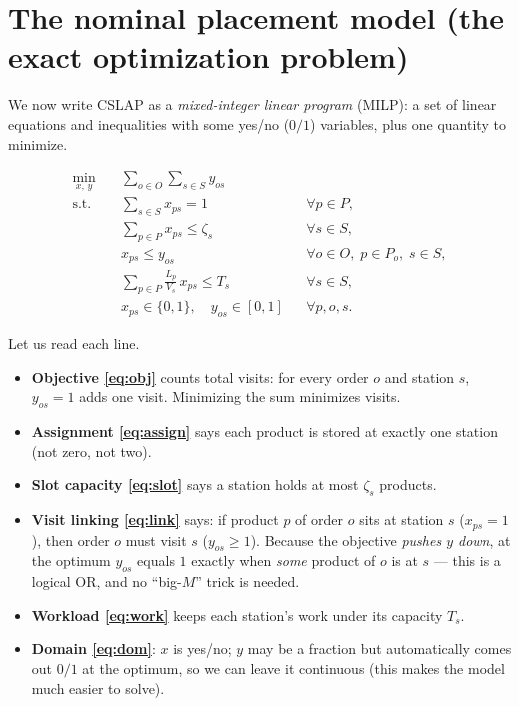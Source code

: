 \documentclass[11pt]{article}
\theoremstyle{definition}
\theoremstyle{plain}
\theoremstyle{remark}
\begin{document}
\section{The nominal placement model (the exact optimization problem)}

We now write CSLAP as a \emph{mixed-integer linear program} (MILP): a set of
linear equations and inequalities with some yes/no ($0/1$) variables, plus one
quantity to minimize.

\begin{align}
\min_{x,\,y}\quad & \sum_{o \in O}\sum_{s \in S} y_{os} \label{eq:obj}\\
\text{s.t.}\quad
& \sum_{s \in S} x_{ps} = 1 && \forall p \in P, \label{eq:assign}\\
& \sum_{p \in P} x_{ps} \le \zeta_s && \forall s \in S, \label{eq:slot}\\
& x_{ps} \le y_{os} && \forall o \in O,\; p \in P_o,\; s \in S, \label{eq:link}\\
& \sum_{p \in P} \frac{L_p}{V_s}\, x_{ps} \le T_s && \forall s \in S, \label{eq:work}\\
& x_{ps}\in\{0,1\},\quad y_{os}\in[0,1] && \forall p,o,s. \label{eq:dom}
\end{align}

Let us read each line.

\begin{itemize}
  \item \textbf{Objective \eqref{eq:obj}} counts total visits: for every order
  $o$ and station $s$, $y_{os}=1$ adds one visit. Minimizing the sum minimizes
  visits.
  \item \textbf{Assignment \eqref{eq:assign}} says each product is stored at
  exactly one station (not zero, not two).
  \item \textbf{Slot capacity \eqref{eq:slot}} says a station holds at most
  $\zeta_s$ products.
  \item \textbf{Visit linking \eqref{eq:link}} says: if product $p$ of order $o$
  sits at station $s$ ($x_{ps}=1$), then order $o$ must visit $s$
  ($y_{os}\ge 1$). Because the objective \emph{pushes $y$ down}, at the optimum
  $y_{os}$ equals $1$ exactly when \emph{some} product of $o$ is at $s$ --- this
  is a logical OR, and no ``big-$M$'' trick is needed.
  \item \textbf{Workload \eqref{eq:work}} keeps each station's work under its
  capacity $T_s$.
  \item \textbf{Domain \eqref{eq:dom}}: $x$ is yes/no; $y$ may be a fraction but
  automatically comes out $0/1$ at the optimum, so we can leave it continuous
  (this makes the model much easier to solve).
\end{itemize}
\end{document}
